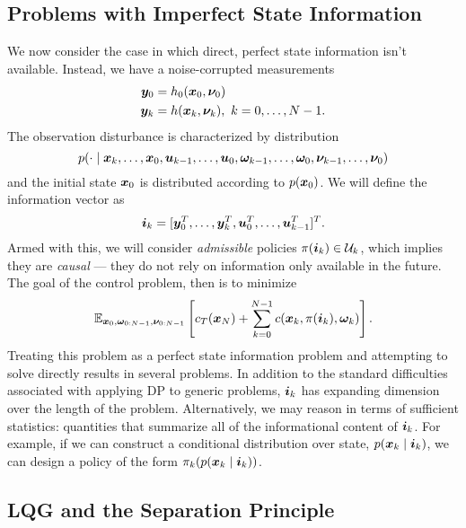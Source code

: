 \subsection{Problems with Imperfect State Information}

We now consider the case in which direct, perfect state information isn't available. Instead, we have a noise-corrupted measurements
\begin{align}
    \bm{y}_0 &= h_0(\bm{x}_0, \bm{\nu}_{0})\\
    \bm{y}_{k} &= h(\bm{x}_k, \bm{\nu}_{k}), \,\, k=0,\ldots,N-1.
\end{align}
The observation disturbance is characterized by distribution 
\begin{equation}
    p(\cdot\mid \bm{x}_k,\ldots,\bm{x}_0,\bm{u}_{k-1},\ldots,\bm{u}_0,\bm{\omega}_{k-1},\ldots,\bm{\omega}_{0},\bm{\nu}_{k-1},\ldots,\bm{\nu}_{0})
\end{equation}
and the initial state $\bm{x}_0$ is distributed according to $p(\bm{x}_0)$. We will define the information vector as
\begin{equation}
    \bm{i}_k = [\bm{y}_0^T, \ldots, \bm{y}_k^T, \bm{u}_0^T, \ldots, \bm{u}_{k-1}^T]^T.
\end{equation}
Armed with this, we will consider \textit{admissible} policies $\pi(\bm{i}_k) \in \mathcal{U}_k$, which implies they are \textit{causal} --- they do not rely on information only available in the future. The goal of the control problem, then is to minimize 
\begin{equation}
    \mathbb{E}_{\bm{x}_{0},\bm{\omega}_{0:N-1},\bm{\nu}_{0:N-1}} \left[ c_T(\bm{x}_N) + \sum_{k=0}^{N-1} c(\bm{x}_k, \pi(\bm{i}_k),\bm{\omega}_{k}) \right].
\end{equation}
Treating this problem as a perfect state information problem and attempting to solve directly results in several problems. In addition to the standard difficulties associated with applying DP to generic problems, $\bm{i}_k$ has expanding dimension over the length of the problem. Alternatively, we may reason in terms of sufficient statistics: quantities that summarize all of the informational content of $\bm{i}_k$. For example, if we can construct a conditional distribution over state, $p(\bm{x}_k\mid\bm{i}_k)$, we can design a policy of the form $\pi_k(p(\bm{x}_k\mid\bm{i}_k))$.

\subsection{LQG and the Separation Principle}

